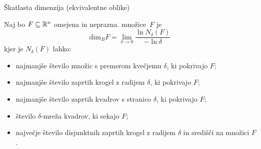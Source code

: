 \documentclass[10pt]{beamer}
\begin{document}

\begin{frame}[t]{Škatlasta dimenzija (ekvivalentne oblike)}  
    \begin{definicija}
        Naj bo \(F \subseteq \mathbb{R}^n\) omejena in neprazna.  množice~\(F\) je 
        \[\text{dim}_B F = \lim_{\delta \to 0} \frac{\ln N_\delta(F)}{-\ln \delta}\]
        kjer je \(N_\delta(F)\) lahko:
        \begin{itemize}
            \item najmanjše število množic s premerom kvečjemu \(\delta\), ki pokrivajo \(F\);
            \item najmanjše število zaprtih krogel z radijem \(\delta\), ki pokrivajo \(F\);
            \item najmanjše število zaprtih kvadrov s stranico \(\delta\), ki pokrivajo \(F\);
            \item število \(\delta\)-mreža kvadrov, ki sekajo \(F\);
            \item največje število disjunktnih zaprtih krogel z radijem \(\delta\) in središči na množici \(F\).
        \end{itemize}
    \end{definicija}
\end{frame}

        
\end{document}
